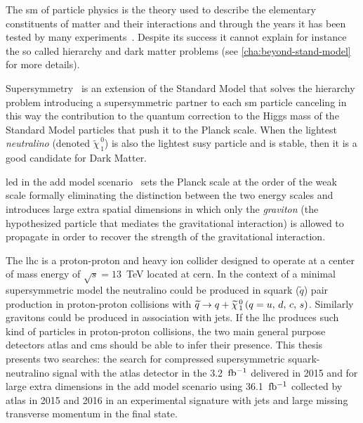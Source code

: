 The \gls{sm} of particle physics is the theory used to describe the elementary
constituents of matter and their interactions and through the years it has been
tested by many experiments~\cite{SMTests}. Despite its success it cannot explain
for instance the so called hierarchy and dark matter problems (see
\cref{cha:beyond-stand-model} for more details).

Supersymmetry~\cite{SUSYIntro} is an extension of the Standard Model that solves
the hierarchy problem introducing a supersymmetric partner to each \gls{sm}
particle canceling in this way the contribution to the quantum correction to the
Higgs mass of the Standard Model particles that push it to the Planck
scale. When the lightest \emph{neutralino} (denoted
$\widetilde{\chi}_{\, 1}^{\, 0}$) is also the lightest \gls{susy} particle and
is stable, then it is a good candidate for Dark Matter.

\gls{led} in the \gls{add} model scenario~\cite{ADDPaper} sets the Planck scale
at the order of the weak scale formally eliminating the distinction between the
two energy scales and introduces large extra spatial dimensions in which only
the \emph{graviton} (the hypothesized particle that mediates the gravitational
interaction) is allowed to propagate in order to recover the strength of the
gravitational interaction.

The \gls{lhc} is a proton-proton and heavy ion collider designed to operate at a
center of mass energy of $\sqrt{s} = 13$~TeV located at \gls{cern}. In the
context of a minimal supersymmetric model the neutralino could be produced in
squark ($\tilde{q}$) pair production in proton-proton collisions with
$\widetilde{q} \rightarrow q + \widetilde{\chi}_{\, 1}^{\, 0}\, (q = u,\, d,\, c,\, s)$. Similarly gravitons could be produced in association with jets.
If the \gls{lhc} produces such kind of particles in proton-proton collisions,
the two main general purpose detectors \gls{atlas} and \gls{cms} should be able
to infer their presence. This thesis presents two searches: the search for
compressed supersymmetric squark-neutralino signal with the \gls{atlas} detector
in the 3.2~$\mbox{fb$^{-1}$}$ delivered in 2015 and for large extra dimensions in the
\gls{add} model scenario using 36.1~$\mbox{fb$^{-1}$}$ collected by \gls{atlas} in 2015 and
2016 in an experimental signature with jets and large missing transverse
momentum in the final state.

